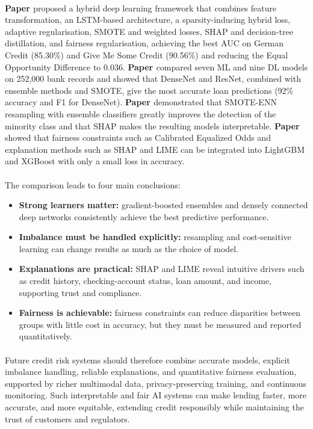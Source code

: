 \documentclass[12pt,a4paper,final]{extreport}
\begin{document}
\paragraph{} \textbf{Paper \cite{p1}} proposed a hybrid deep learning framework that combines feature transformation, an LSTM-based architecture, a sparsity-inducing hybrid loss, adaptive regularisation, SMOTE and weighted losses, SHAP and decision-tree distillation, and fairness regularisation, achieving the best AUC on German Credit (85.30\%) and Give Me Some Credit (90.56\%) and reducing the Equal Opportunity Difference to 0.036. \textbf{Paper \cite{p2}} compared seven ML and nine DL models on 252{,}000 bank records and showed that DenseNet and ResNet, combined with ensemble methods and SMOTE, give the most accurate loan predictions (92\% accuracy and F1 for DenseNet). \textbf{Paper \cite{p3}} demonstrated that SMOTE-ENN resampling with ensemble classifiers greatly improves the detection of the minority class and that SHAP makes the resulting models interpretable. \textbf{Paper \cite{p4}} showed that fairness constraints such as Calibrated Equalized Odds and explanation methods such as SHAP and LIME can be integrated into LightGBM and XGBoost with only a small loss in accuracy.

\paragraph{} The comparison leads to four main conclusions:
\begin{itemize}
  \item \textbf{Strong learners matter:} gradient-boosted ensembles and densely connected deep networks consistently achieve the best predictive performance.
  \item \textbf{Imbalance must be handled explicitly:} resampling and cost-sensitive learning can change results as much as the choice of model.
  \item \textbf{Explanations are practical:} SHAP and LIME reveal intuitive drivers such as credit history, checking-account status, loan amount, and income, supporting trust and compliance.
  \item \textbf{Fairness is achievable:} fairness constraints can reduce disparities between groups with little cost in accuracy, but they must be measured and reported quantitatively.
\end{itemize}

\paragraph{} Future credit risk systems should therefore combine accurate models, explicit imbalance handling, reliable explanations, and quantitative fairness evaluation, supported by richer multimodal data, privacy-preserving training, and continuous monitoring. Such interpretable and fair AI systems can make lending faster, more accurate, and more equitable, extending credit responsibly while maintaining the trust of customers and regulators.
\end{document}
